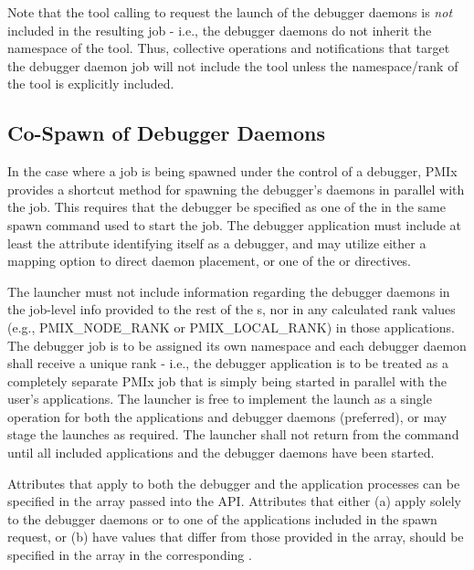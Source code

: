 \adviceuserstart
Note that the tool calling  to request the launch of the debugger daemons is \emph{not} included in the resulting job - i.e., the debugger daemons do not inherit the namespace of the tool. Thus, collective operations and notifications that target the debugger daemon job will not include the tool unless the namespace/rank of the tool is explicitly included.
\adviceuserend

\subsection{Co-Spawn of Debugger Daemons}
\label{chap:api_tools:cospawn}

In the case where a job is being spawned under the control of a debugger, \ac{PMIx} provides a shortcut method for spawning the debugger's daemons in parallel with the job. This requires that the debugger be specified as one of the  in the same spawn command used to start the job. The debugger application must include at least the  attribute identifying itself as a debugger, and may utilize either a mapping option to direct daemon placement, or one of the  or  directives.

The launcher must not include information regarding the debugger daemons in
the job-level info
provided to the rest of the s, nor in any calculated rank
values (e.g., PMIX_NODE_RANK or PMIX_LOCAL_RANK) in those applications. The
debugger job is to be assigned its own namespace and each debugger daemon shall
receive a unique rank - i.e., the debugger application is to be treated as a
completely separate \ac{PMIx} job that is simply being started in parallel with
the user's applications. The launcher is free to implement the launch as a
single operation for both the applications and debugger daemons (preferred), or
may stage the launches as required. The launcher shall not return from the
 command until all included applications and the debugger
daemons have been started.

Attributes that apply to both the debugger and the application processes can
be specified in the  array passed into the
 \ac{API}. Attributes that either (a) apply solely to the
debugger daemons or to one of the applications included in the spawn request,
or (b) have values that differ from those provided in the 
array, should be specified in the  array in the corresponding
.

